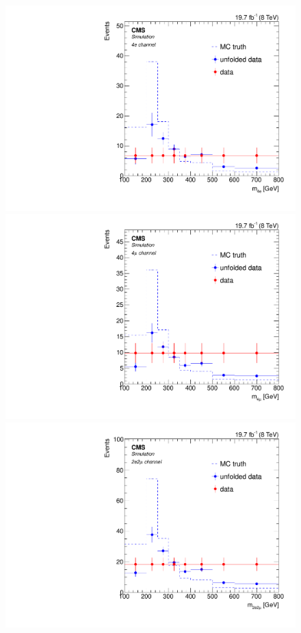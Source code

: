 \begin{figure}[hbtp]
 \begin{center}
   \includegraphics[width=0.8\cmsFigWidth]{Figures/Unfolding/MCTests/Biased_Distributions/Mass_ZZTo4e_Pow_fr_SVD_2}     
   \includegraphics[width=0.8\cmsFigWidth]{Figures/Unfolding/MCTests/Biased_Distributions/Mass_ZZTo4m_Pow_fr_SVD_2}     
   \includegraphics[width=0.8\cmsFigWidth]{Figures/Unfolding/MCTests/Biased_Distributions/Mass_ZZTo2e2m_Pow_fr_SVD_2}

\end{center}
\end{figure}

